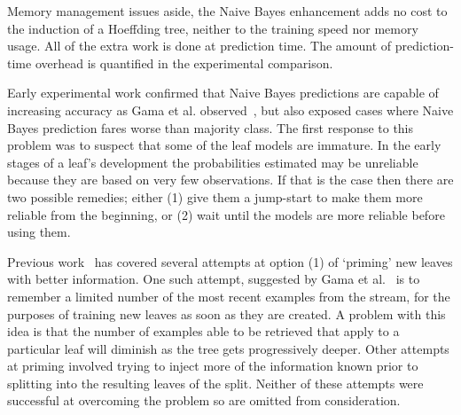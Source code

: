Memory management issues aside, the Naive Bayes enhancement adds no cost to the induction of a Hoeffding tree, neither to the training speed nor memory usage. All of the extra work is done at prediction time. The amount of prediction-time overhead is quantified in the experimental comparison.

Early experimental work confirmed that Naive Bayes predictions are capable of increasing accuracy as Gama et al. observed~\cite{ufft,vfdtc}, but also exposed cases where Naive Bayes prediction fares worse than majority class. The first response to this problem was to suspect that some of the leaf models are immature. In the early stages of a leaf's development the probabilities estimated may be unreliable because they are based on very few observations. If that is the case then there are two possible remedies; either (1) give them a jump-start to make them more reliable from the beginning, or (2) wait until the models are more reliable before using them.

Previous work~\cite{stresstest} has covered several attempts at option (1) of `priming' new leaves with better information. One such attempt, suggested by Gama et al.~\cite{ufft} is to remember a limited number of the most recent examples from the stream, for the purposes of training new leaves as soon as they are created. A problem with this idea is that the number of examples able to be retrieved that apply to a particular leaf will diminish as the tree gets progressively deeper. Other attempts at priming involved trying to inject more of the information known prior to splitting into the resulting leaves of the split. Neither of these attempts were successful at overcoming the problem so are omitted from consideration.



